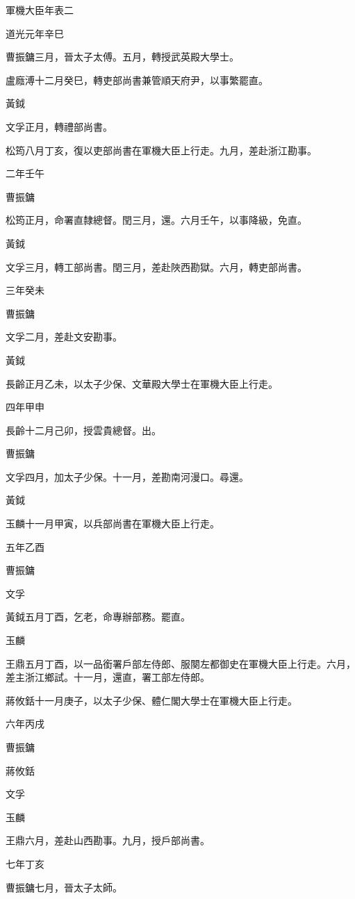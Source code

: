 
\begin{pinyinscope}
軍機大臣年表二

道光元年辛巳

曹振鏞三月，晉太子太傅。五月，轉授武英殿大學士。

盧廕溥十二月癸巳，轉吏部尚書兼管順天府尹，以事繁罷直。

黃鉞

文孚正月，轉禮部尚書。

松筠八月丁亥，復以吏部尚書在軍機大臣上行走。九月，差赴浙江勘事。

二年壬午

曹振鏞

松筠正月，命署直隸總督。閏三月，還。六月壬午，以事降級，免直。

黃鉞

文孚三月，轉工部尚書。閏三月，差赴陜西勘獄。六月，轉吏部尚書。

三年癸未

曹振鏞

文孚二月，差赴文安勘事。

黃鉞

長齡正月乙未，以太子少保、文華殿大學士在軍機大臣上行走。

四年甲申

長齡十二月己卯，授雲貴總督。出。

曹振鏞

文孚四月，加太子少保。十一月，差勘南河漫口。尋還。

黃鉞

玉麟十一月甲寅，以兵部尚書在軍機大臣上行走。

五年乙酉

曹振鏞

文孚

黃鉞五月丁酉，乞老，命專辦部務。罷直。

玉麟

王鼎五月丁酉，以一品銜署戶部左侍郎、服闋左都御史在軍機大臣上行走。六月，差主浙江鄉試。十一月，還直，署工部左侍郎。

蔣攸銛十一月庚子，以太子少保、體仁閣大學士在軍機大臣上行走。

六年丙戌

曹振鏞

蔣攸銛

文孚

玉麟

王鼎六月，差赴山西勘事。九月，授戶部尚書。

七年丁亥

曹振鏞七月，晉太子太師。


\end{pinyinscope}
